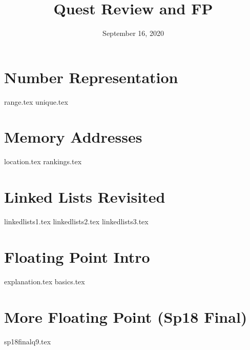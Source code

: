 \documentclass[11pt]{exam}
\title{Quest Review and FP}
\date{September 16, 2020}
\begin{document}
\maketitle

\section{Number Representation}
\begin{questions}
{range.tex}
{unique.tex}
\end{questions}
\newpage

\section{Memory Addresses}
\begin{questions}
{location.tex}
{rankings.tex}
\end{questions}

\section{Linked Lists Revisited}
\begin{questions}
{linkedlists1.tex}
{linkedlists2.tex}
{linkedlists3.tex}
\end{questions}
\newpage

\section{Floating Point Intro}
\begin{questions}
{explanation.tex}
{basics.tex}
\end{questions}
\newpage

\section{More Floating Point (Sp18 Final)}
\begin{questions}
{sp18finalq9.tex}
\end{questions}
\newpage
\end{document}
